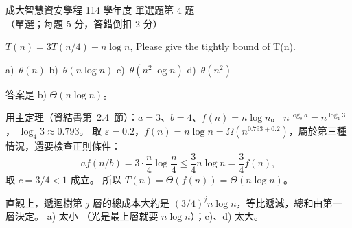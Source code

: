 \begin{pastexam}[label={px:ncku-114-isec-ds-04}]{成大智慧資安學程 114 學年度 單選題第 4 題}
（單選；每題 5 分，答錯倒扣 2 分）

$T(n)=3T(n/4)+n\log n$, Please give the tightly bound of T(n).

a)~$\theta(n)$ \qquad b)~$\theta(n\log n)$ \qquad c)~$\theta(n^2\log n)$ \qquad d)~$\theta(n^2)$
\end{pastexam}

\begin{pastsoln}
答案是 b) $\Theta(n \log n)$。

用主定理（資結書第~2.4~節）：$a = 3$、$b = 4$、$f(n) = n \log n$。 $n^{\log_b a} = n^{\log_4 3}$，
$\log_4 3 \approx 0.793$。 取 $\varepsilon = 0.2$，$f(n) = n \log n = \Omega(n^{0.793 + 0.2})$，屬於第三種
情況，還要檢查正則條件：
\[
a f(n/b) = 3 \cdot \frac{n}{4} \log \frac{n}{4} \le \frac{3}{4} n \log n = \frac{3}{4} f(n),
\]
取 $c = 3/4 < 1$ 成立。 所以 $T(n) = \Theta(f(n)) = \Theta(n \log n)$。

直觀上，遞迴樹第 $j$ 層的總成本大約是 $(3/4)^j n \log n$，等比遞減，總和由第一層決定。 a) 太小
（光是最上層就要 $n \log n$）；c)、d) 太大。
\end{pastsoln}
